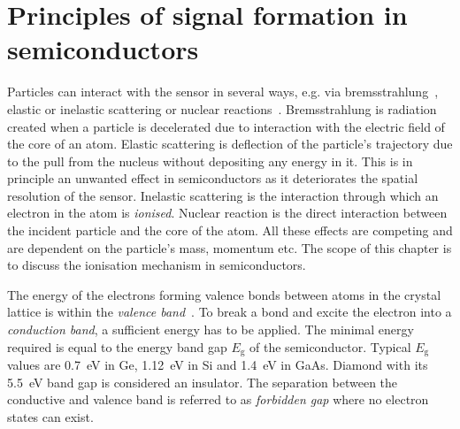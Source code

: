 \section{Principles of signal formation in semiconductors}
\label{sec:princsigfor}
Particles can interact with the sensor in several ways, e.g. via bremsstrahlung~\cite{BREMS:00000}, elastic or inelastic scattering or nuclear reactions~\cite{PARMA:00000}. Bremsstrahlung is radiation created when a particle is decelerated due to interaction with the electric field of the core of an atom. Elastic scattering is deflection of the particle's trajectory due to the pull from the nucleus without depositing any energy in it. This is in principle an unwanted effect in semiconductors as it deteriorates the spatial resolution of the sensor. Inelastic scattering is the interaction through which an electron in the atom is \emph{ionised}. Nuclear reaction is the direct interaction between the incident particle and the core of the atom. All these effects are competing and are dependent on the particle's mass, momentum etc. The scope of this chapter is to discuss the ionisation mechanism in semiconductors.

The energy of the electrons forming valence bonds between atoms in the crystal lattice is within the \emph{valence band}~\cite{PHSEM:00000}. To break a bond and excite the electron into a \emph{conduction band}, a sufficient energy has to be applied. The minimal energy required is equal to the energy band gap $E_\mathrm{g}$ of the semiconductor. Typical $E_\mathrm{g}$ values are 0.7~eV in Ge, 1.12~eV in Si and 1.4~eV in GaAs. Diamond with its 5.5~eV band gap is considered an insulator. The separation between the conductive and valence band is referred to as \emph{forbidden gap} where no electron states can exist.


